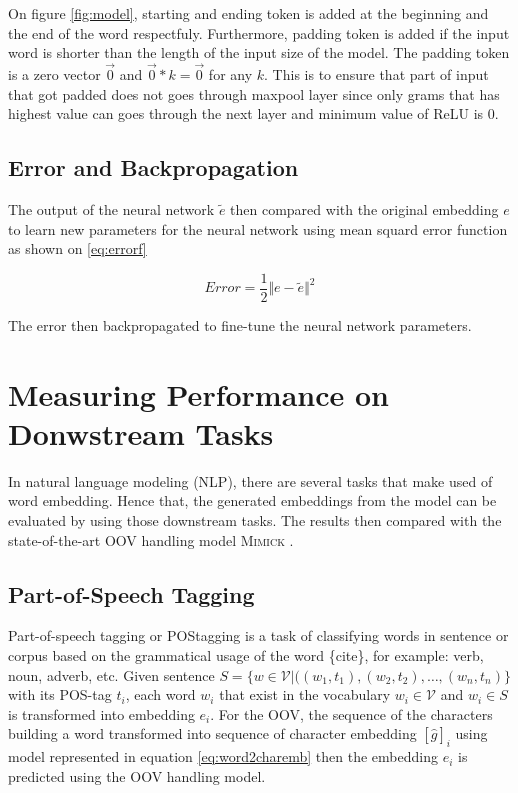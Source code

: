         On figure \ref{fig:model}, starting and ending token is added
        at the beginning and the end of the word respectfuly.
        Furthermore, padding token is added if the input word is
        shorter than the length of the input size of the model. The
        padding token is a zero vector $\vec{0}$ and $\vec{0} * k =
        \vec{0}$ for any $k$. This is to ensure that part of input
        that got padded does not goes through maxpool layer since only
        grams that has highest value can goes through the next layer
        and minimum value of ReLU is 0.

    \subsection{Error and Backpropagation}
        The output of the neural network $\tilde{e}$ then compared
        with the original embedding $e$ to learn new parameters for
        the neural network using mean squard error function as shown
        on \ref{eq:errorf}

        \begin{equation}
            \label{eq:errorf}
            Error = \frac{1}{2} \Vert e - \tilde{e} \Vert ^{2}
        \end{equation}

        The error then backpropagated to fine-tune the neural network
        parameters.
        
\section{Measuring Performance on Donwstream Tasks}
    In natural language modeling (NLP), there are several tasks that
    make used of word embedding. Hence that, the generated embeddings
    from the model can be evaluated by using those downstream tasks.
    The results then compared with the state-of-the-art OOV handling
    model \textsc{Mimick} \citep{mimicking2017Pinter}.
    
    \subsection{Part-of-Speech Tagging}
        Part-of-speech tagging or POStagging is a task of classifying
        words in sentence or corpus based on the grammatical usage of
        the word \{cite\}, for example: verb, noun, adverb, etc. Given
        sentence $S = \{w \in \mathcal{V} \vert ((w_1, t_1), (w_2,
        t_2), \dots, (w_n, t_n)\}$ with its POS-tag $t_i$, each word
        $w_i$ that exist in the vocabulary $w_i \in \mathcal{V}$ and
        $w_i \in S$ is transformed into embedding $e_i$. For the OOV,
        the sequence of the characters building a word transformed
        into sequence of character embedding $[\hat{g}]_i$ using model
        represented in equation \ref{eq:word2charemb} then the
        embedding $e_i$ is predicted using the OOV handling model.

